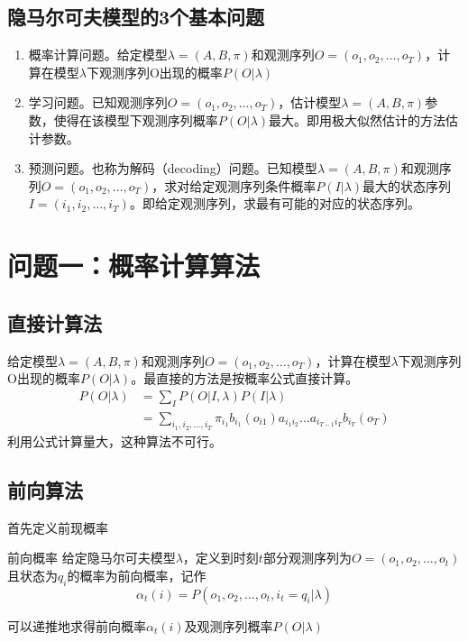 \subsection*{隐马尔可夫模型的3个基本问题}
\begin{enumerate}
	\item 概率计算问题。给定模型$\lambda=(A,B,\pi)$和观测序列$O=(o_1,o_2,\dots,o_T)$，计算在模型$\lambda$下观测序列O出现的概率$P(O|\lambda)$
	\item 学习问题。已知观测序列$O=(o_1,o_2,\dots,o_T)$，估计模型$\lambda=(A,B,\pi)$参数，使得在该模型下观测序列概率$P(O|\lambda)$最大。即用极大似然估计的方法估计参数。
	\item 预测问题。也称为解码（decoding）问题。已知模型$\lambda=(A,B,\pi)$和观测序列$O=(o_1,o_2,\dots,o_T)$，求对给定观测序列条件概率$P(I|\lambda)$最大的状态序列$I=(i_1,i_2,\dots,i_T)$。即给定观测序列，求最有可能的对应的状态序列。
\end{enumerate} 

\section*{问题一：概率计算算法}
\subsection*{直接计算法}
给定模型$\lambda=(A,B,\pi)$和观测序列$O=(o_1,o_2,\dots,o_T)$，计算在模型$\lambda$下观测序列O出现的概率$P(O|\lambda)$。最直接的方法是按概率公式直接计算。
\begin{equation}
\begin{aligned}
	P(O|\lambda)&=\sum_{I}P(O|I,\lambda)P(I|\lambda)\\
	&=\sum_{i_1,i_2,\dots,i_T}\pi_{i_1}b_{i_1}(o_{i1})a_{i_1i_2}\dots a_{i_{T-1}i_T}b_{i_T}(o_T)
\end{aligned}
\end{equation}
利用公式计算量大，这种算法不可行。
\subsection*{前向算法}
首先定义前现概率
\begin{definition}{前向概率}{}
	给定隐马尔可夫模型$\lambda$，定义到时刻$t$部分观测序列为$O=(o_1,o_2,\dots,o_t)$且状态为$q_i$的概率为前向概率，记作
	\begin{equation}
		\alpha_t(i)=P(o_1,o_2,\dots,o_t,i_t=q_i|\lambda)
	\end{equation}
\end{definition}
可以递推地求得前向概率$\alpha_t(i)$及观测序列概率$P(O|\lambda)$

